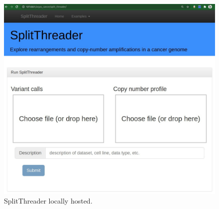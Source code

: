 \documentclass{svproc}
\begin{document}
\begin{figure}[h]
	\centering
	\includegraphics[width=\textwidth]{img/splitthreader/split_threader_1}
	\caption{SplitThreader locally hosted. }
	\label{fig:split_threader_1}
\end{figure}
\end{document}
